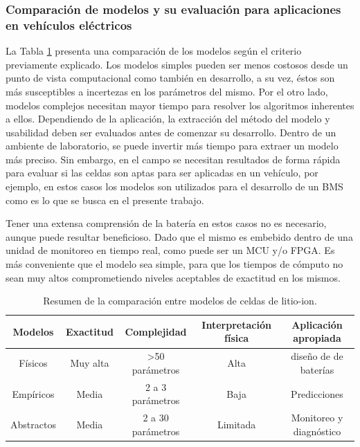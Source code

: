 \documentclass[10pt,a4paper]{article}
\begin{document}
\subsubsection{Comparaci\'on de modelos y su evaluaci\'on para aplicaciones
en veh\'iculos el\'ectricos}\label{compModels}

\noindent La Tabla \ref{table_comp_models} presenta una comparaci\'on de los
modelos seg\'un el criterio previamente explicado. Los modelos simples pueden
ser menos costosos desde un punto de vista computacional como tambi\'en en
desarrollo, a su vez, \'estos son más susceptibles a incertezas en los
par\'ametros del mismo. Por el otro lado, modelos complejos necesitan mayor
tiempo para resolver los algoritmos inherentes a ellos.  Dependiendo de la
aplicaci\'on, la extracci\'on del m\'etodo del modelo y usabilidad deben ser
evaluados antes de comenzar su desarrollo.  Dentro de un ambiente de
laboratorio, se puede invertir m\'as tiempo para extraer un modelo m\'as
preciso. Sin embargo, en el campo se necesitan resultados de forma r\'apida para
evaluar si las celdas son aptas para ser aplicadas en un veh\'iculo, por
ejemplo, en estos casos los modelos son utilizados para el desarrollo de un
\acrshort{BMS} como es lo que se busca en el presente trabajo. 

\noindent Tener una extensa comprensi\'on de la bater\'ia en estos casos no es
necesario, aunque puede resultar beneficioso. Dado que el mismo es embebido
dentro de una unidad de monitoreo en tiempo real, como puede ser un 
\acrshort{MCU} y/o \acrshort{FPGA}. Es m\'as conveniente que el modelo sea 
simple, para que los tiempos de c\'omputo no sean muy altos comprometiendo 
niveles aceptables de exactitud en los mismos. 

\begin{table}[h!]
\begin{center}
\begin{tabular}{@{}ccccc@{}}
\textbf{Modelos} & \textbf{Exactitud} & \textbf{Complejidad} &
\textbf{Interpretaci\'on f\'isica} & \textbf{Aplicaci\'on apropiada}\\
\hline
F\'isicos   & Muy alta  & \textgreater{}50 par\'ametros         & Alta
& diseño de de bater\'ias \\\hline Emp\'iricos & Media 
& 2 a 3 par\'ametros & Baja & Predicciones\\ 
\hline Abstractos & Media & 2 a 30 par\'ametros & Limitada & 
Monitoreo y diagn\'ostico
\end{tabular}
\caption{Resumen de la comparaci\'on entre modelos de celdas de litio-ion.}
\label{table_comp_models}
\end{center}
\end{table}
\end{document}

